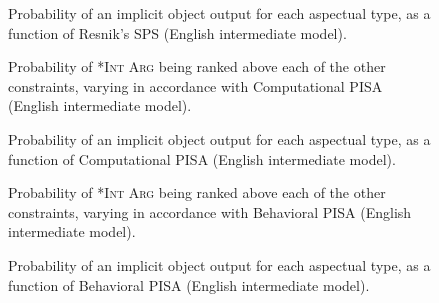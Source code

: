 \begin{figure}[H]
\caption{Probability of an implicit object output for each aspectual type, as a function of Resnik's SPS (English intermediate model).}
    
\end{figure}



\begin{figure}[H]
\caption{Probability of \textsc{*Int Arg} being ranked above each of the other constraints, varying in accordance with Computational PISA (English intermediate model).}
    
\end{figure}

\begin{figure}[H]
\caption{Probability of an implicit object output for each aspectual type, as a function of Computational PISA (English intermediate model).}
    
\end{figure}



\begin{figure}[H]
\caption{Probability of \textsc{*Int Arg} being ranked above each of the other constraints, varying in accordance with Behavioral PISA (English intermediate model).}
    
\end{figure}

\begin{figure}[H]
\caption{Probability of an implicit object output for each aspectual type, as a function of Behavioral PISA (English intermediate model).}
    
\end{figure}


\clearpage %

